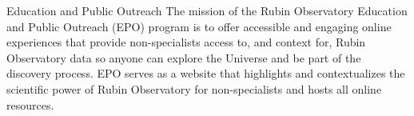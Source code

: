 Education and Public Outreach
The mission of the Rubin Observatory Education and Public Outreach (EPO) program is to offer accessible and engaging online experiences that provide non-specialists access to, and context for, Rubin Observatory data so anyone can explore the Universe and be part of the discovery process. EPO serves as a website that highlights and contextualizes the scientific power of Rubin Observatory for non-specialists and hosts all online resources.